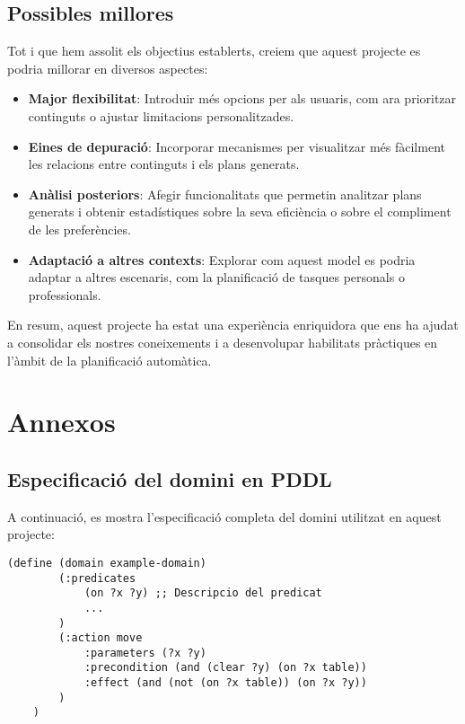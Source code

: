 \documentclass[a4paper]{article}
\begin{document}
	
	\subsection{Possibles millores}	

	Tot i que hem assolit els objectius establerts, creiem que aquest projecte es podria millorar en diversos aspectes:
	\begin{itemize}
		\item \textbf{Major flexibilitat}: Introduir més opcions per als usuaris, com ara prioritzar continguts o ajustar limitacions personalitzades.
		\item \textbf{Eines de depuració}: Incorporar mecanismes per visualitzar més fàcilment les relacions entre continguts i els plans generats.
		\item \textbf{Anàlisi posteriors}: Afegir funcionalitats que permetin analitzar plans generats i obtenir estadístiques sobre la seva eficiència o sobre el compliment de les preferències.
		\item \textbf{Adaptació a altres contexts}: Explorar com aquest model es podria adaptar a altres escenaris, com la planificació de tasques personals o professionals.
	\end{itemize}
	
	En resum, aquest projecte ha estat una experiència enriquidora que ens ha ajudat a consolidar els nostres coneixements i a desenvolupar habilitats pràctiques en l'àmbit de la planificació automàtica.	
	
	\newpage
	\appendix
	\section{Annexos}
	
	\subsection{Especificació del domini en PDDL}
	
	A continuació, es mostra l'especificació completa del domini utilitzat en aquest projecte:
	
	\begin{lstlisting}[language=PDDL, caption={Especificació del domini en PDDL}, label={lst:dominiPDDL}]
	(define (domain example-domain)
		(:predicates
			(on ?x ?y) ;; Descripcio del predicat
			...
		)
		(:action move
			:parameters (?x ?y)
			:precondition (and (clear ?y) (on ?x table))
			:effect (and (not (on ?x table)) (on ?x ?y))
		)
	)
	\end{lstlisting}
	
\end{document}
